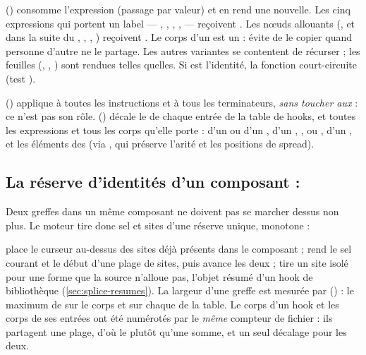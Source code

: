  () consomme l'expression (passage par valeur) et en rend une nouvelle. Les cinq expressions qui portent un label --- , , , ,  --- reçoivent . Les nœuds allouants (, et dans la suite du , , , ) reçoivent . Le corps d'un  est un  :  évite de le copier quand personne d'autre ne le partage. Les autres variantes se contentent de récurser ; les feuilles (, , ) sont rendues telles quelles. Si  est l'identité, la fonction court-circuite (test ).

 () applique  à toutes les instructions et à tous les terminateurs, \emph{sans toucher aux}  : ce n'est pas son rôle.  () décale le  de chaque entrée de la table de hooks, et toutes les expressions et tous les corps qu'elle porte :  d'un  ou d'un ,  d'un , ,  ou ,  d'un , et les éléments des  (via , qui préserve l'arité et les positions de spread).

\subsection{La réserve d'identités d'un composant : \texorpdfstring{}{SpliceIds}}

Deux greffes dans un même composant ne doivent pas se marcher dessus non plus. Le moteur tire donc sel et sites d'une réserve unique, monotone :


 place le curseur  au-dessus des sites déjà présents dans le composant ;  rend le sel courant et le début d'une plage de  sites, puis avance les deux ;  tire un site isolé pour une forme que la source n'alloue pas, l'objet résumé d'un hook de bibliothèque (\cref{sec:splice-resumes}). La largeur d'une greffe est mesurée par  () : le maximum de  sur le corps et sur chaque  de la table. Le corps d'un hook et les corps de ses entrées ont été numérotés par le \emph{même} compteur de fichier : ils partagent une plage, d'où le  plutôt qu'une somme, et un seul décalage pour les deux.

